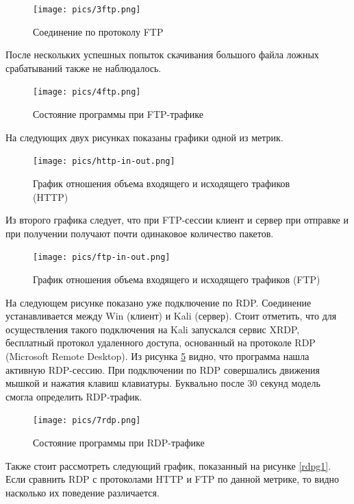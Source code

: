 \documentclass[bachelor, och, coursework]{SCWorks}
\begin{document}
\begin{figure}[H]
  \centering
  \texttt{[image: pics/3ftp.png]}
  \caption{Соединение по протоколу FTP}
  \label{ftp1}
\end{figure}

После нескольких успешных попыток скачивания большого файла ложных срабатываний также не наблюдалось.


\begin{figure}[H]
  \centering
  \texttt{[image: pics/4ftp.png]}
  \caption{Состояние программы при FTP-трафике}
  \label{ftp2}
\end{figure}

На следующих двух рисунках показаны графики одной из метрик. 



\begin{figure}[H]
  \centering
  \texttt{[image: pics/http-in-out.png]}
  \caption{График отношения объема входящего и исходящего трафиков (HTTP)}
  \label{httpg1}
\end{figure}

Из второго графика следует, что при FTP-сессии клиент и сервер при отправке и при получении получают почти одинаковое 
количество пакетов.


\begin{figure}[H]
  \centering
  \texttt{[image: pics/ftp-in-out.png]}
  \caption{График отношения объема входящего и исходящего трафиков (FTP)}
  \label{ftpg1}
\end{figure}


На следующем рисунке показано уже подключение по RDP. Соединение устанавливается между Win (клиент) и Kali (сервер). 
Стоит отметить, что для осуществления такого подключения на Kali запускался сервис XRDP, бесплатный протокол 
удаленного доступа, основанный на протоколе RDP (Microsoft Remote Desktop). Из рисунка \ref{rdp1} видно, что программа
нашла активную RDP-сессию. При подключении по RDP совершались движения мышкой и нажатия клавиш клавиатуры. Буквально после 30 секунд
модель смогла определить RDP-трафик.

\begin{figure}[H]
  \centering
  \texttt{[image: pics/7rdp.png]}
  \caption{Состояние программы при RDP-трафике}
  \label{rdp1}
\end{figure}

Также стоит рассмотреть следующий график, показанный на рисунке \ref{rdpg1}. Если сравнить RDP с протоколами HTTP и FTP по данной 
метрике, то видно насколько их поведение различается.
\end{document}
